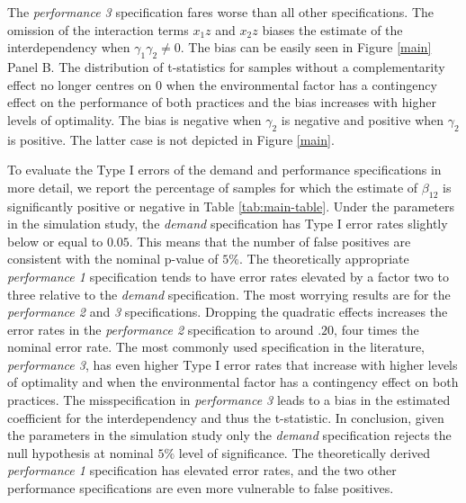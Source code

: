 \documentclass[12pt]{article}
\begin{document}
The \emph{performance 3} specification fares worse than all other specifications. The omission of the interaction terms \(x_1z\) and \(x_2z\) biases the estimate of the interdependency when $\gamma_1 \gamma_2 \neq 0$. The bias can be easily seen in Figure \ref{main} Panel B. The distribution of t-statistics for samples without a complementarity effect no longer centres on $0$ when the environmental factor has a contingency effect on the performance of both practices and the bias increases with higher levels of optimality. The bias is negative when $\gamma_2$ is negative and positive when $\gamma_2$ is positive. The latter case is not depicted in Figure \ref{main}.

To evaluate the Type I errors of the demand and performance specifications in more detail, we report the percentage of samples for which the estimate of $\beta_{12}$ is significantly positive or negative  in Table \ref{tab:main-table}. Under the parameters in the simulation study, the \emph{demand} specification has Type I error rates slightly below or equal to $0.05$. This means that the number of false positives are consistent with the nominal p-value of $5\%$. The theoretically appropriate \emph{performance 1} specification tends to have error rates elevated by a factor two to three relative to the \emph{demand} specification. The most worrying results are for the \emph{performance 2} and \emph{3} specifications. Dropping the quadratic effects increases the error rates in the \emph{performance 2} specification to around $.20$, four times the nominal error rate. The most commonly used specification in the literature, \emph{performance 3}, has even higher Type I error rates that increase with higher levels of optimality and when the environmental factor has a contingency effect on both practices. The misspecification in \emph{performance 3} leads to a bias in the estimated coefficient for the interdependency and thus the t-statistic. In conclusion, given the parameters in the simulation study only the \emph{demand} specification rejects the null hypothesis at nominal $5\%$ level of significance. The theoretically derived \emph{performance 1} specification has elevated error rates, and the two other performance specifications are even more vulnerable to false positives.
\end{document}
